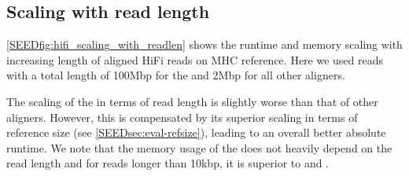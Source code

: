 \subsection{Scaling with read length}

\cref{SEEDfig:hifi_scaling_with_readlen} shows the runtime and memory scaling with
increasing length of aligned HiFi reads on MHC reference. Here we used reads
with a total length of 100Mbp for the \seedh and 2Mbp for all other aligners.

The scaling of the \seedh in terms of read length is slightly worse than that of
other aligners. However, this is compensated by its superior scaling in terms of
reference size (see \cref{SEEDsec:eval-refsize}), leading to an overall better
absolute runtime. We note that the memory usage of the \seedh does not heavily
depend on the read length and for reads longer than 10kbp, it is superior to
\graphaligner and \vargas.


